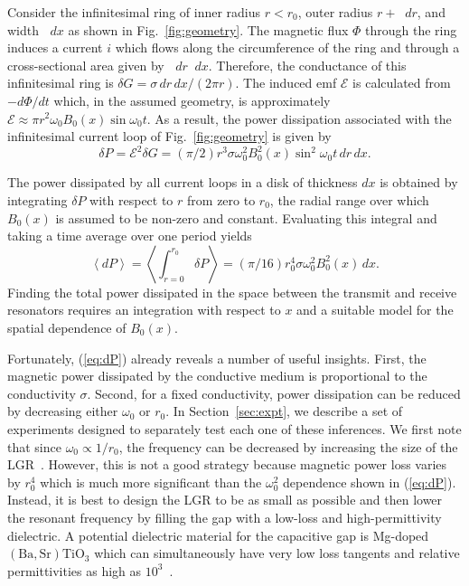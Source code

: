 \documentclass[conference]{IEEEtran}
\begin{document}
Consider the infinitesimal ring of inner radius $r < r_0$, outer radius $r + \mathop{}\!d r$, and width $\mathop{}\!d x$ as shown in Fig.~\ref{fig:geometry}.  The magnetic flux $\Phi$ through the ring induces a current $i$ which flows along the circumference of the ring and through a cross-sectional area given by $\mathop{}\!d r \mathop{}\!d x$.  Therefore, the conductance of this infinitesimal ring is $\delta G=\sigma\,dr\,dx/\left(2\pi r\right)$. The induced emf $\mathcal{E}$ is calculated from $-d\Phi/dt$ which, in the assumed geometry, is approximately $\mathcal{E}\approx \pi r^2\omega_0 B_0(x)\sin\omega_0 t$. As a result, the power dissipation associated with the infinitesimal current loop of Fig.~\ref{fig:geometry} is given by
\begin{equation}
    \delta P=\mathcal{E}^2\delta G = \left(\pi/2\right) r^3\sigma\omega_0^2 B_0^2(x) \sin^2\omega_0 t\, dr\, dx.\label{eq:deltaP}
\end{equation}

The power dissipated by all current loops in a disk of thickness $dx$ is obtained by integrating $\delta P$ with respect to $r$ from zero to $r_0$, the radial range over which $B_0(x)$ is assumed to be non-zero and constant.  Evaluating this integral and taking a time average over one period yields
\begin{equation}
    \left\langle dP\right\rangle=\left\langle\int_{r=0}^{r_0}\delta P\right\rangle = \left(\pi/16\right) r_0^4\sigma\omega_0^2 B_0^2(x)\, dx.\label{eq:dP}
\end{equation}
Finding the total power dissipated in the space between the transmit and receive resonators requires an integration with respect to $x$ and a suitable model for the spatial dependence of $B_0(x)$. 

Fortunately, (\ref{eq:dP}) already reveals a number of useful insights.  First, the magnetic power dissipated by the conductive medium is proportional to the conductivity $\sigma$.  Second, for a fixed conductivity, power dissipation can be reduced by decreasing either $\omega_0$ or $r_0$. In Section~\ref{sec:expt}, we describe a set of experiments designed to separately test each one of these inferences.  We first note that since $\omega_0\propto 1/r_0$, the frequency can be decreased by increasing the size of the LGR~\cite{Hardy:1981, Bobowski:2013}.  However, this is not a good strategy because magnetic power loss varies by  $r_0^4$ which is much more significant than the $\omega_0^2$ dependence shown  in (\ref{eq:dP}).  Instead, it is best to design the LGR to be as small as possible and then lower the resonant frequency by filling the gap with a low-loss and high-permittivity dielectric.  A potential dielectric material for the capacitive gap is Mg-doped $\left(\mathrm{Ba},\mathrm{Sr}\right)\mathrm{TiO}_3$ which can simultaneously have very low loss tangents and relative permittivities as high as $10^3$~\cite{Nenasheva:2010, Song:2016}.
\end{document}
